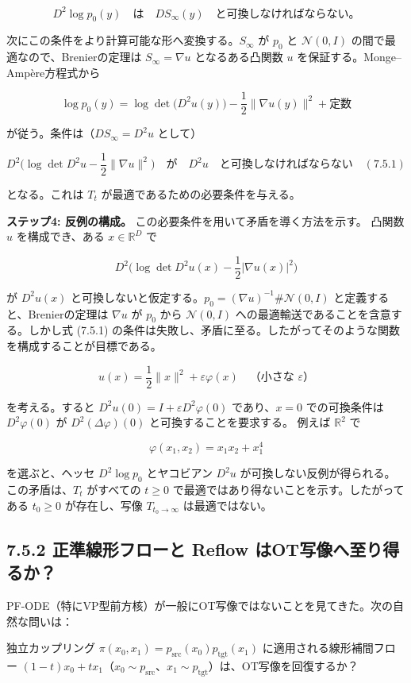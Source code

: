 \[
D^2\log p_0(y)\quad\text{は}\quad DS_\infty(y)\quad\text{と可換しなければならない。}
\]


次にこの条件をより計算可能な形へ変換する。$S_\infty$ が $p_0$ と $\mathcal{N}(0,I)$ の間で最適なので、Brenierの定理は $S_\infty=\nabla u$ となるある凸関数 $u$ を保証する。Monge–Ampère方程式から

\[
\log p_0(y)=\log\det\bigl(D^2 u(y)\bigr)-\frac{1}{2}\|\nabla u(y)\|^2+\text{定数}
\]


が従う。条件は（$DS_\infty=D^2 u$ として）

\[
D^2\Biggl(\log\det D^2 u-\frac{1}{2}\|\nabla u\|^2\Biggr)\quad\text{が}\quad D^2 u\quad\text{と可換しなければならない} \quad (7.5.1)
\]


となる。これは $T_t$ が最適であるための必要条件を与える。

\textbf{ステップ4: 反例の構成。} この必要条件を用いて矛盾を導く方法を示す。
凸関数 $u$ を構成でき、ある $x\in\mathbb{R}^D$ で

\[
D^2\Biggl(\log\det D^2 u(x)-\frac{1}{2}|\nabla u(x)|^2\Biggr)
\]


が $D^2 u(x)$ と可換しないと仮定する。$p_0=(\nabla u)^{-1}\#\mathcal{N}(0,I)$ と定義すると、Brenierの定理は $\nabla u$ が $p_0$ から $\mathcal{N}(0,I)$ への最適輸送であることを含意する。しかし式 (7.5.1) の条件は失敗し、矛盾に至る。したがってそのような関数を構成することが目標である。

\[
u(x)=\frac{1}{2}\|x\|^2+\varepsilon\varphi(x)\quad\text{（小さな }\varepsilon\text{）}
\]


を考える。すると $D^2 u(0)=I+\varepsilon D^2\varphi(0)$ であり、$x=0$ での可換条件は $D^2\varphi(0)$ が $D^2(\Delta\varphi)(0)$ と可換することを要求する。
例えば $\mathbb{R}^2$ で

\[
\varphi(x_1,x_2)=x_1 x_2+x_1^4
\]


を選ぶと、ヘッセ $D^2\log p_0$ とヤコビアン $D^2 u$ が可換しない反例が得られる。
この矛盾は、$T_t$ がすべての $t\ge 0$ で最適ではあり得ないことを示す。したがってある $t_0\ge 0$ が存在し、写像 $T_{t_0\to\infty}$ は最適ではない。

\subsection*{7.5.2 正準線形フローと Reflow はOT写像へ至り得るか？}


PF-ODE（特にVP型前方核）が一般にOT写像ではないことを見てきた。次の自然な問いは：

\begin{propositionbox}[問い 7.5.1]
独立カップリング $\pi(x_0,x_1)=p_{\mathrm{src}}(x_0)p_{\mathrm{tgt}}(x_1)$ に適用される線形補間フロー $(1-t)x_0+t x_1$（$x_0\sim p_{\mathrm{src}}$、$x_1\sim p_{\mathrm{tgt}}$）は、OT写像を回復するか？
\end{propositionbox}


